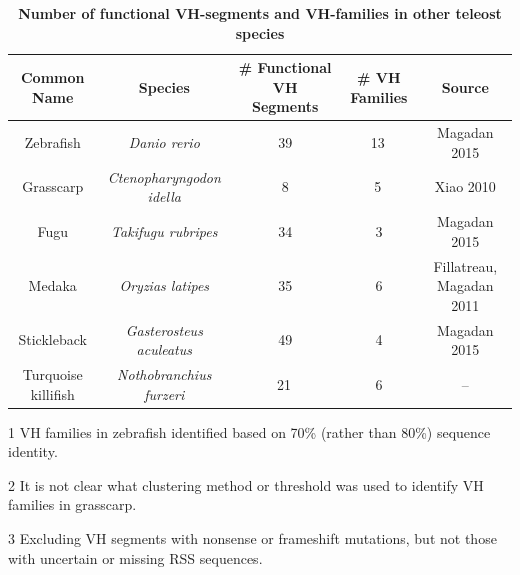 	\begin{table}
	\begin{threeparttable}
	\caption{\textbf{Number of functional VH-segments and VH-families in other teleost species}}
	\begin{tabular}{ccccc}\toprule
	\textbf{Common Name} & \textbf{Species} & \textbf{\# Functional VH Segments} & \textbf{\# VH Families} & \textbf{Source}\\\midrule
	Zebrafish & \textit{Danio rerio} & 39 & 13\,\tnote{1} & Magadan 2015 \\
	Grasscarp & \textit{Ctenopharyngodon idella} & 8 & 5\,\tnote{2} & Xiao 2010 \\
	Fugu & \textit{Takifugu rubripes} & 34 & 3 & Magadan 2015 \\
	Medaka & \textit{Oryzias latipes} & 35 & 6 & Fillatreau, Magadan 2011 \\
	Stickleback & \textit{Gasterosteus aculeatus} & 49 & 4 & Magadan 2015 \\
	Turquoise killifish & \textit{Nothobranchius furzeri} & 21\,\tnote{3} & 6 & -- \\
	\bottomrule\end{tabular}
	\begin{tablenotes}
	\item[1] VH families in zebrafish identified based on 70\% (rather than 80\%) sequence identity.
	\item[2] It is not clear what clustering method or threshold was used to identify VH families in grasscarp.
	\item[3] Excluding VH segments with nonsense or frameshift mutations, but not those with uncertain or missing RSS sequences.
	\end{tablenotes}
	\end{threeparttable}
	\label{tab:teleost-vh-counts}
	\end{table} %
	
